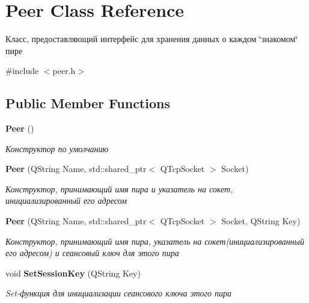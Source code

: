 \section{Peer Class Reference}
\label{class_peer}


Класс, предоставляющий интерфейс для хранения данных о каждом \char`\"{}знакомом\char`\"{} пире  




{\ttfamily \#include $<$peer.\+h$>$}

\subsection*{Public Member Functions}
\begin{DoxyCompactItemize}
\item 
\textbf{ Peer} ()
\begin{DoxyCompactList}\small\item\em Конструктор по умолчанию \end{DoxyCompactList}\item 
\textbf{ Peer} (Q\+String Name, std\+::shared\+\_\+ptr$<$ Q\+Tcp\+Socket $>$ Socket)
\begin{DoxyCompactList}\small\item\em Конструктор, принимающий имя пира и указатель на сокет, инициализированный его адресом \end{DoxyCompactList}\item 
\textbf{ Peer} (Q\+String Name, std\+::shared\+\_\+ptr$<$ Q\+Tcp\+Socket $>$ Socket, Q\+String Key)
\begin{DoxyCompactList}\small\item\em Конструктор, принимающий имя пира, указатель на сокет(инициализированный его адресом) и сеансовый ключ для этого пира \end{DoxyCompactList}\item 
void \textbf{ Set\+Session\+Key} (Q\+String Key)
\begin{DoxyCompactList}\small\item\em Set-\/функция для инициализации сеансового ключа этого пира \end{DoxyCompactList}\end{DoxyCompactItemize}
